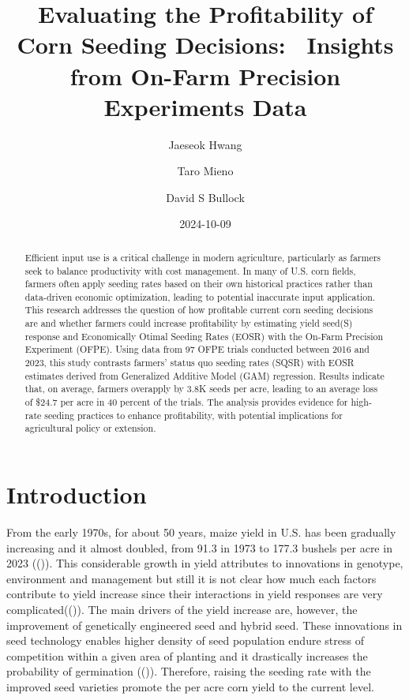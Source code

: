 \documentclass[
]{article}
\title{Evaluating the Profitability of Corn Seeding Decisions: ~Insights
from On-Farm Precision Experiments Data}
\author{Jaeseok Hwang}
\affil{%
                  University of Illinois at Urbana Champaign
              }
\author{Taro Mieno}
\affil{%
                  University of Nebraska-Lincoln
              }
\author{David S Bullock}
\affil{%
                  University of Illinois at Urbana Champaign
              }
\date{2024-10-09}
\begin{document}
\maketitle
\begin{abstract}
Efficient input use is a critical challenge in modern agriculture,
particularly as farmers seek to balance productivity with cost
management. In many of U.S. corn fields, farmers often apply seeding
rates based on their own historical practices rather than data-driven
economic optimization, leading to potential inaccurate input
application. This research addresses the question of how profitable
current corn seeding decisions are and whether farmers could increase
profitability by estimating yield seed(S) response and Economically
Otimal Seeding Rates (EOSR) with the On-Farm Precision Experiment
(OFPE). Using data from 97 OFPE trials conducted between 2016 and 2023,
this study contrasts farmers' status quo seeding rates (SQSR) with EOSR
estimates derived from Generalized Additive Model (GAM) regression.
Results indicate that, on average, farmers overapply by 3.8K seeds per
acre, leading to an average loss of \$24.7 per acre in 40 percent of the
trials. The analysis provides evidence for high-rate seeding practices
to enhance profitability, with potential implications for agricultural
policy or extension.
\end{abstract}


\newpage

\section{Introduction}\label{introduction}

From the early 1970s, for about 50 years, maize yield in U.S. has been
gradually increasing and it almost doubled, from 91.3 in 1973 to 177.3
bushels per acre in 2023 (()). This
considerable growth in yield attributes to innovations in genotype,
environment and management but still it is not clear how much each
factors contribute to yield increase since their interactions in yield
responses are very complicated(()).
The main drivers of the yield increase are, however, the improvement of
genetically engineered seed and hybrid seed. These innovations in seed
technology enables higher density of seed population endure stress of
competition within a given area of planting and it drastically increases
the probability of germination
(()). Therefore, raising the
seeding rate with the improved seed varieties promote the per acre corn
yield to the current level.
\end{document}
